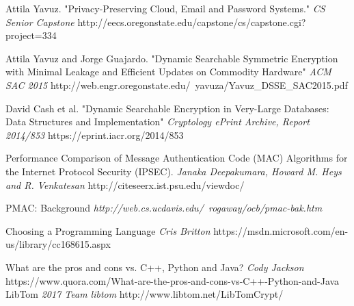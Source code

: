 \begin{thebibliography}{10} 		
    	Attila Yavuz.
    	"Privacy-Preserving Cloud, Email and Password Systems."
        \textit{CS Senior Capstone}
        http://eecs.oregonstate.edu/capstone/cs/capstone.cgi?project=334
        
    	Attila Yavuz and Jorge Guajardo.
        "Dynamic Searchable Symmetric Encryption with Minimal Leakage and Efficient Updates on
Commodity Hardware"
		\textit{ACM SAC 2015}
        http://web.engr.oregonstate.edu/~yavuza/Yavuz\_DSSE\_SAC2015.pdf
        
    	David Cash et al.
        "Dynamic Searchable Encryption in Very-Large Databases: Data Structures and Implementation"
        \textit{Cryptology ePrint Archive, Report 2014/853}
        https://eprint.iacr.org/2014/853
        
     Performance Comparison of Message Authentication Code (MAC) Algorithms for the
Internet Protocol Security (IPSEC). 
	\textit{Janaka Deepakumara, Howard M. Heys and R. Venkatesan }
    http://citeseerx.ist.psu.edu/viewdoc/

    PMAC: Background
    	\textit{http://web.cs.ucdavis.edu/~rogaway/ocb/pmac-bak.htm}
	
    Choosing a Programming Language
    	\textit{Cris Britton}
    	https://msdn.microsoft.com/en-us/library/cc168615.aspx    

    What are the pros and cons vs. C++, Python and Java?
    	\textit{Cody Jackson}
    	https://www.quora.com/What-are-the-pros-and-cons-vs-C++-Python-and-Java
    LibTom
    	\textit{ 2017 Team libtom}
        http://www.libtom.net/LibTomCrypt/

\end{thebibliography}
    
 







